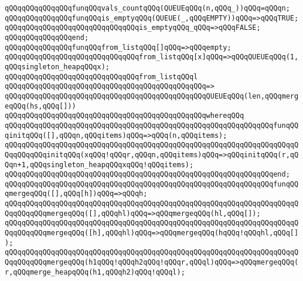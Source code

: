 \newline
\verb|qQQqqQQqqQQqqQQqfunqQQqvals_countqQQq(QUEUEqQQq(n,qQQq_))qQQq=qQQqn;|\newline
\newline
\verb|qQQqqQQqqQQqqQQqfunqQQqis_emptyqQQq(QUEUE(_,qQQqEMPTY))qQQq=>qQQqTRUE;|\newline
\verb|qQQqqQQqqQQqqQQqqQQqqQQqqQQqqQQqis_emptyqQQq_qQQq=>qQQqFALSE;|\newline
\verb|qQQqqQQqqQQqqQQqend;|\newline
\newline
\verb|qQQqqQQqqQQqqQQqfunqQQqfrom_listqQQq[]qQQq=>qQQqempty;|\newline
\verb|qQQqqQQqqQQqqQQqqQQqqQQqqQQqqQQqfrom_listqQQq[x]qQQq=>qQQqQUEUEqQQq(1,qQQqsingleton_heapqQQqx);|\newline
\verb|qQQqqQQqqQQqqQQqqQQqqQQqqQQqqQQqfrom_listqQQql|\newline
\verb|qQQqqQQqqQQqqQQqqQQqqQQqqQQqqQQqqQQqqQQqqQQqqQQq=>|\newline
\verb|qQQqqQQqqQQqqQQqqQQqqQQqqQQqqQQqqQQqqQQqqQQqqQQqQUEUEqQQq(len,qQQqmergeqQQq(hs,qQQq[]))|\newline
\verb|qQQqqQQqqQQqqQQqqQQqqQQqqQQqqQQqqQQqqQQqqQQqqQQqwhereqQQq|\newline
\newline
\verb|qQQqqQQqqQQqqQQqqQQqqQQqqQQqqQQqqQQqqQQqqQQqqQQqqQQqqQQqqQQqqQQqfunqQQqinitqQQq([],qQQqn,qQQqitems)qQQq=>qQQq(n,qQQqitems);|\newline
\verb|qQQqqQQqqQQqqQQqqQQqqQQqqQQqqQQqqQQqqQQqqQQqqQQqqQQqqQQqqQQqqQQqqQQqqQQqqQQqqQQqinitqQQq(xqQQq!qQQqr,qQQqn,qQQqitems)qQQq=>qQQqinitqQQq(r,qQQqn+1,qQQqsingleton_heapqQQqxqQQq!qQQqitems);|\newline
\verb|qQQqqQQqqQQqqQQqqQQqqQQqqQQqqQQqqQQqqQQqqQQqqQQqqQQqqQQqqQQqqQQqend;|\newline
\newline
\verb|qQQqqQQqqQQqqQQqqQQqqQQqqQQqqQQqqQQqqQQqqQQqqQQqqQQqqQQqqQQqqQQqfunqQQqmergeqQQq([],qQQq[h])qQQq=>qQQqh;|\newline
\verb|qQQqqQQqqQQqqQQqqQQqqQQqqQQqqQQqqQQqqQQqqQQqqQQqqQQqqQQqqQQqqQQqqQQqqQQqqQQqqQQqmergeqQQq([],qQQqhl)qQQq=>qQQqmergeqQQq(hl,qQQq[]);|\newline
\verb|qQQqqQQqqQQqqQQqqQQqqQQqqQQqqQQqqQQqqQQqqQQqqQQqqQQqqQQqqQQqqQQqqQQqqQQqqQQqqQQqmergeqQQq([h],qQQqhl)qQQq=>qQQqmergeqQQq(hqQQq!qQQqhl,qQQq[]);|\newline
\verb|qQQqqQQqqQQqqQQqqQQqqQQqqQQqqQQqqQQqqQQqqQQqqQQqqQQqqQQqqQQqqQQqqQQqqQQqqQQqqQQqmergeqQQq(h1qQQq!qQQqh2qQQq!qQQqr,qQQql)qQQq=>qQQqmergeqQQq(r,qQQqmerge_heapqQQq(h1,qQQqh2)qQQq!qQQql);|\newline
